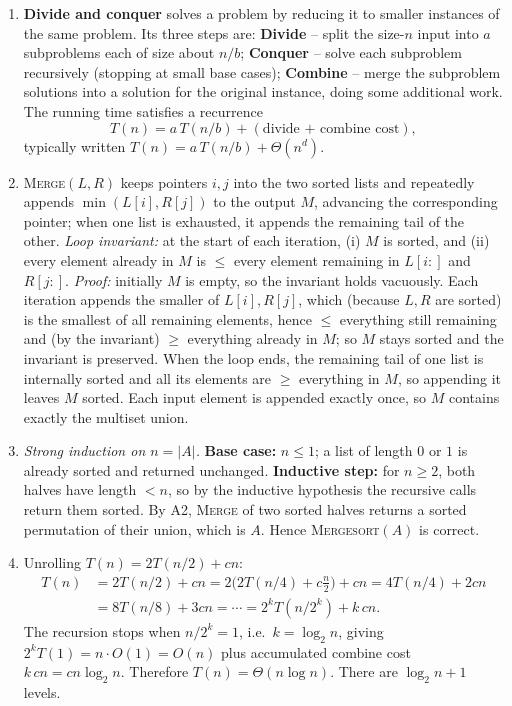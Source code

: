\documentclass[11pt]{article}
\begin{document}
\begin{enumerate}[label=\textbf{A\arabic*.}, leftmargin=2.2em]

\item \textbf{Divide and conquer} solves a problem by reducing it to smaller instances of
the same problem. Its three steps are: \textbf{Divide} -- split the size-$n$ input into $a$
subproblems each of size about $n/b$; \textbf{Conquer} -- solve each subproblem recursively
(stopping at small base cases); \textbf{Combine} -- merge the subproblem solutions into a
solution for the original instance, doing some additional work. The running time satisfies a
recurrence
\[
    T(n) = a\,T(n/b) + (\text{divide + combine cost}),
\]
typically written $T(n) = a\,T(n/b) + \Theta(n^d)$.

\item \textsc{Merge}$(L,R)$ keeps pointers $i,j$ into the two sorted lists and repeatedly
appends $\min(L[i], R[j])$ to the output $M$, advancing the corresponding pointer; when one
list is exhausted, it appends the remaining tail of the other. \textit{Loop invariant:} at
the start of each iteration, (i) $M$ is sorted, and (ii) every element already in $M$ is
$\le$ every element remaining in $L[i\mathbin{:}]$ and $R[j\mathbin{:}]$. \textit{Proof:}
initially $M$ is empty, so the invariant holds vacuously. Each iteration appends the smaller
of $L[i], R[j]$, which (because $L,R$ are sorted) is the smallest of all remaining elements,
hence $\le$ everything still remaining and (by the invariant) $\ge$ everything already in
$M$; so $M$ stays sorted and the invariant is preserved. When the loop ends, the remaining
tail of one list is internally sorted and all its elements are $\ge$ everything in $M$, so
appending it leaves $M$ sorted. Each input element is appended exactly once, so $M$ contains
exactly the multiset union.

\item \textit{Strong induction on $n = |A|$.} \textbf{Base case:} $n \le 1$; a list of
length $0$ or $1$ is already sorted and returned unchanged. \textbf{Inductive step:} for $n
\ge 2$, both halves have length $< n$, so by the inductive hypothesis the recursive calls
return them sorted. By A2, \textsc{Merge} of two sorted halves returns a sorted permutation
of their union, which is $A$. Hence \textsc{Mergesort}$(A)$ is correct.

\item Unrolling $T(n) = 2T(n/2) + cn$:
\[
\begin{aligned}
T(n) &= 2T(n/2) + cn = 2\bigl(2T(n/4) + c\tfrac n2\bigr) + cn = 4T(n/4) + 2cn \\
     &= 8T(n/8) + 3cn = \cdots = 2^k T(n/2^k) + k\,cn.
\end{aligned}
\]
The recursion stops when $n/2^k = 1$, i.e.\ $k = \log_2 n$, giving $2^k T(1) = n\cdot O(1) =
O(n)$ plus accumulated combine cost $k\,cn = cn\log_2 n$. Therefore $T(n) = \Theta(n \log
n)$. There are $\log_2 n + 1$ levels.


\end{enumerate}
\end{document}
